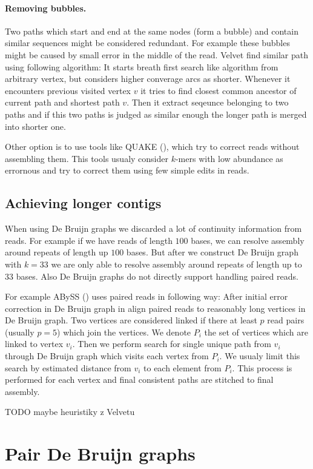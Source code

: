 \paragraph{Removing bubbles.} Two paths which start and end at the same nodes (form a bubble)
and contain similar sequences might be considered redundant.
For example these bubbles might be caused by small error in the middle of the read.
Velvet find similar path using following algorithm:
It starts breath first search like algorithm from arbitrary vertex, but considers higher converage
arcs as shorter. Whenever it encounters previous visited vertex $v$ it tries to find closest common ancestor
of current path and shortest path $v$. Then it extract seqeunce belonging to two paths and if this two
paths is judged as similar enough the longer path is merged into shorter one. 
 
\bigskip

Other option is to use tools like QUAKE (\cite{Quake}), which try to correct reads
without assembling them. This tools usualy consider $k$-mers with low abundance
as errornous and try to correct them using few simple edits in reads.


\subsection{Achieving longer contigs}

When using De Bruijn graphs we discarded a lot of continuity information from reads.
For example if we have reads of length $100$ bases, we can resolve assembly around repeats
of length up $100$ bases. But after we construct De Bruijn graph with $k = 33$ we are only
able to resolve assembly around repeats of length up to $33$ bases. Also De Bruijn graphs
do not directly support handling paired reads.

For example ABySS (\cite{Abyss}) uses paired reads in following way:
After initial error correction in De Bruijn graph in align paired reads
to reasonably long vertices in De Bruijn graph. Two vertices are considered linked
if there at least $p$ read pairs (usually $p=5$) which join the vertices.
We denote $P_i$ the set of vertices which are linked to vertex $v_i$.
Then we perform search for single unique path from $v_i$ through De Bruijn graph which visits
each vertex from $P_i$. We usualy limit this search by estimated distance from $v_i$ to each element
from $P_i$. This process is performed for each vertex and final consistent paths are stitched to final assembly.

TODO maybe heuristiky z Velvetu

\section{Pair De Bruijn graphs}



